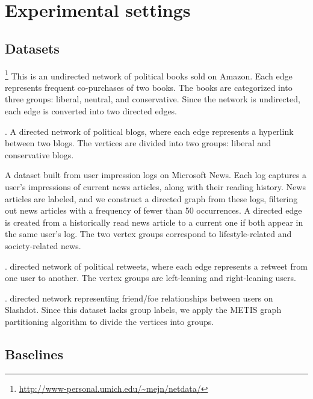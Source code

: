 \section{Experimental settings}

\subsection{Datasets}
\label{appendix:datasets}

\noindent 
\book \footnote{\url{http://www-personal.umich.edu/~mejn/netdata/}} This is an undirected network of political books sold on Amazon. Each edge represents frequent co-purchases of two books. The books are categorized into three groups: liberal, neutral, and conservative. Since the network is undirected, each edge is converted into two directed edges. 

\smallskip
\noindent 
\blogs \citep{adamic_political_2005}. A directed network of political blogs, where each edge represents a hyperlink between two blogs. The vertices are divided into two groups: liberal and conservative blogs.

\smallskip
\noindent 
\mind \citep{wu2020mind} A dataset built from user impression logs on Microsoft News. Each log captures a user's impressions of current news articles, along with their reading history. News articles are labeled, and we construct a directed graph from these logs, filtering out news articles with a frequency of fewer than 50 occurrences. A directed edge is created from a historically read news article to a current one if both appear in the same user's log. The two vertex groups correspond to lifestyle-related and society-related news\fnlabels.


\smallskip
\noindent 
\twitter \citep{nr-sigkdd16}. \Amatrix directed network of political retweets, where each edge represents a retweet from one user to another. The vertex groups are left-leaning and right-leaning users.

\smallskip
\noindent 
\slashdot \citep{leskovec_community_2009}. \Amatrix directed network representing friend/foe relationships between users on Slashdot. Since this dataset lacks group labels, we apply the METIS graph partitioning algorithm \citep{karypis_metis_1997} to divide the vertices into groups. 



\subsection{Baselines}
\label{appendix:baselines}

